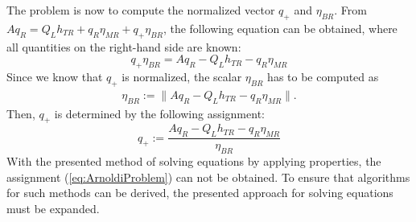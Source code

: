 %
The problem is now to compute the normalized vector $q_+$ and $\eta_{BR}$. From $A q_R = Q_L h_{TR} + q_R \eta_{MR} + q_+ \eta_{BR}$, the following equation can be obtained, where all quantities on the right-hand side are known:
%
$$q_+ \eta_{BR} = A q_R - Q_L h_{TR} - q_R \eta_{MR}$$
%
Since we know that $q_+$ is normalized, the scalar $\eta_{BR}$ has to be computed as
%
\begin{align}
\eta_{BR} :=  \| A q_R - Q_L h_{TR} - q_R \eta_{MR} \| \text{.}
\label{eq:ArnoldiProblem}
\end{align}
%
Then, $q_+$ is determined by the following assignment:
%
$$q_+ := \frac{A q_R - Q_L h_{TR} - q_R \eta_{MR}}{\eta_{BR}}$$
%
With the presented method of solving equations by applying properties, the assignment (\ref{eq:ArnoldiProblem}) can not be obtained. To ensure that algorithms for such methods can be derived, the presented approach for solving equations must be expanded.

